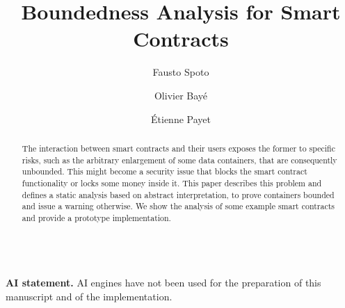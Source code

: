 \documentclass{llncs}
\begin{document}
\begin{frontmatter}

  \title{Boundedness Analysis for Smart Contracts}

  \author{
    Fausto Spoto
    \and
    Olivier Bay\'e
    \and
    \'Etienne Payet
  }

  \maketitle

  \begin{abstract}
    The interaction between smart contracts and their users exposes
    the former to specific risks, such as the arbitrary enlargement
    of some data containers, that are consequently unbounded.
    This might become
    a security issue that blocks the smart contract functionality or
    locks some money inside it. This paper describes this problem and
    defines a static analysis based on abstract interpretation,
    to prove containers bounded and issue a warning otherwise.
    We show the analysis of some example smart contracts and provide
    a prototype implementation.
  \end{abstract}

\end{frontmatter}









\mbox{}\\
\noindent
\textbf{AI statement.} AI engines have not been used for
the preparation of this manuscript and of the implementation.





\end{document}
